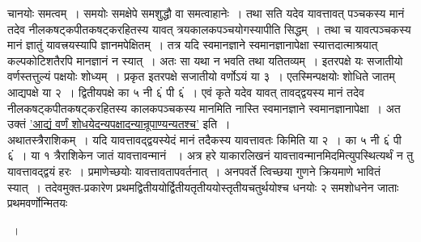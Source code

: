 \documentclass[11pt, openany]{book}
\begin{document}
\newpage

\begin{sloppypar}
\noindent चानयोः समत्वम्~। समयोः समक्षेपे समशुद्धौ वा समत्वाहानेः~। तथा सति यदेव यावत्तावत् पञ्चकस्य मानं तदेव नीलकषट्कपीतकषट्करहितस्य यावत् त्रयकालकपञ्चयोगस्यापीति सिद्धम्~। तथा च यावत्पञ्चकस्य मानं ज्ञातुं यावत्त्रयस्यापि ज्ञानमपेक्षितम्~। तत्र यदि स्वमानज्ञाने स्वमानज्ञानापेक्षा स्यात्तदात्माश्रयात् कल्पकोटिशतैरपि मानज्ञानं न स्यात्~। अतः सा यथा न भवति तथा यतितव्यम्~। इतरपक्षे यः सजातीयो वर्णस्तत्तुल्यं पक्षयोः शोध्यम्~। प्रकृत इतरपक्षे सजातीयो वर्णोऽयं या ३~। एतस्मिन्पक्षयोः शोधिते जातम् आद्यपक्षे या २~। द्वितीयपक्षे का ५ नी ६ं पी ६ं~। एवं कृते यदेव यावत् तावद्द्वयस्य मानं तदेव नीलकषट्कपीतकषट्करहितस्य कालकपञ्चकस्य मानमिति नास्ति स्वमानज्ञाने स्वमानज्ञानापेक्षा~। अत उक्तं \hyperref[9.134]{'आद्यं वर्णं शोधयेदन्यपक्षादन्यान्रूपाण्यन्यतश्च'} इति~।\\

अथातस्त्रैराशिकम्~। यदि यावत्तावद्द्वयस्येदं मानं तदैकस्य यावत्तावतः किमिति या २~। का ५ नी ६ं पी ६ं~। या १ त्रैराशिकेन जातं यावत्तावन्मानं ~। अत्र हरे याकारलिखनं यावत्तावन्मानमिदमित्युपस्थित्यर्थं न तु यावत्तावद्द्वयं हरः~। प्रमाणेच्छयोः यावत्तावतापवर्तनात्~। अनपवर्ते त्विच्छया गुणने क्रियमाणे भावितं स्यात्~। तदेवमुक्त-प्रकारेण प्रथमद्वितीययोर्द्वितीयतृतीययोस्तृतीयचतुर्थयोश्च धनयोः २ समशोधनेन जाताः प्रथमवर्णोन्मितयः\\
\vspace{-2mm}

 \hspace{6mm}  \hspace{6mm} ~।\\


\end{sloppypar}
\end{document}
